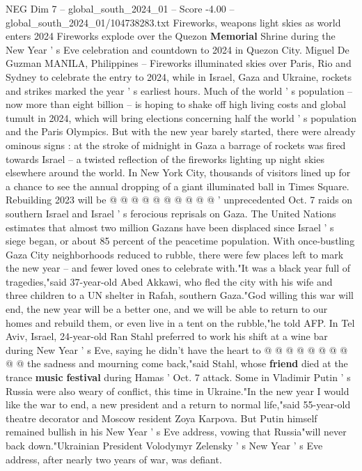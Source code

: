\begin{textsample}{NEG Dim 7 – global\_south\_2024\_01 – Score -4.00 – global\_south\_2024\_01/104738283.txt}  \label{ex:f7_neg_409}
Fireworks, weapons light skies as world enters 2024 Fireworks explode over the Quezon \textbf{Memorial} Shrine during the New Year ' s Eve celebration and countdown to 2024 in Quezon City.
Miguel De Guzman MANILA, Philippines -- Fireworks illuminated skies over Paris, Rio and Sydney to celebrate the entry to 2024, while in Israel, Gaza and Ukraine, rockets and strikes marked the year ' s earliest hours.
Much of the world ' s population -- now more than eight billion -- is hoping to shake off high living costs and global tumult in 2024, which will bring elections concerning half the world ' s population and the Paris Olympics.
But with the new year barely started, there were already ominous signs : at the stroke of midnight in Gaza a barrage of rockets was fired towards Israel -- a twisted reflection of the fireworks lighting up night skies elsewhere around the world.
In New York City, thousands of visitors lined up for a chance to see the annual dropping of a giant illuminated ball in Times Square.
Rebuilding 2023 will be @ @ @ @ @ @ @ @ @ @ ' unprecedented Oct. 7 raids on southern Israel and Israel ' s ferocious reprisals on Gaza.
The United Nations estimates that almost two million Gazans have been displaced since Israel ' s siege began, or about 85 percent of the peacetime population.
With once-bustling Gaza City neighborhoods reduced to rubble, there were few places left to mark the new year -- and fewer loved ones to celebrate with."It was a black year full of tragedies,"said 37-year-old Abed Akkawi, who fled the city with his wife and three children to a UN shelter in Rafah, southern Gaza."God willing this war will end, the new year will be a better one, and we will be able to return to our homes and rebuild them, or even live in a tent on the rubble,"he told AFP.
In Tel Aviv, Israel, 24-year-old Ran Stahl preferred to work his shift at a wine bar during New Year ' s Eve, saying he didn't have the heart to @ @ @ @ @ @ @ @ @ @ the sadness and mourning come back,"said Stahl, whose \textbf{friend} died at the trance \textbf{music} \textbf{festival} during Hamas ' Oct. 7 attack.
Some in Vladimir Putin ' s Russia were also weary of conflict, this time in Ukraine."In the new year I would like the war to end, a new president and a return to normal life,"said 55-year-old theatre decorator and Moscow resident Zoya Karpova.
But Putin himself remained bullish in his New Year ' s Eve address, vowing that Russia"will never back down."Ukrainian President Volodymyr Zelensky ' s New Year ' s Eve address, after nearly two years of war, was defiant.

\end{textsample}
